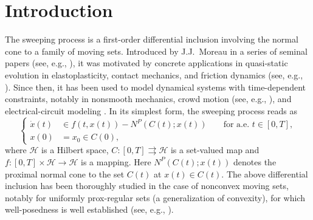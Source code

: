 \documentclass[preprint,12pt]{elsarticle}
\renewcommand{\H}{\mathcal{H}}
\newcommand{\tto}{\rightrightarrows}
\theoremstyle{plain}
\theoremstyle{definition}
\theoremstyle{remark}
\begin{document}


\section{Introduction}
The sweeping process is a first-order differential inclusion involving the normal cone to a family of moving sets. Introduced by J.J.~Moreau in a series of seminal papers (see, e.g., \cite{MO1,MO2,MR508661}), it was motivated by concrete applications in quasi-static evolution in elastoplasticity, contact mechanics, and friction dynamics (see, e.g., \cite{Moreau_2004,MR513445}). Since then, it has been used to model dynamical systems with time-dependent constraints, notably in nonsmooth mechanics, crowd motion (see, e.g., \cite{Brogliato-M,Maury-Venel}), and electrical-circuit modeling \cite{Acary-Bon-Bro-2011}. In its simplest form, the sweeping process reads as
\begin{equation}\label{sp111111}
  \left\{
  \begin{aligned}
    \dot{x}(t)&\in f(t,x(t)) - N^P(C(t);x(t)) && \text{ for a.e. } t\in[0,T],\\
    x(0)&=x_0\in C(0),
  \end{aligned}
  \right.
\end{equation}
where $\H$ is a Hilbert space, $C\colon[0,T]\tto \H$ is a set-valued map and $f\colon[0,T]\times \H \to \H$ is a mapping. Here $N^P(C(t);x(t))$ denotes the proximal normal cone to the set $C(t)$ at $x(t)\in C(t)$. The above differential inclusion has been thoroughly studied in the case of nonconvex moving sets, notably for uniformly prox-regular sets (a generalization of convexity), for which well-posedness is well established (see, e.g., \cite{MR1994056}).
\end{document}
